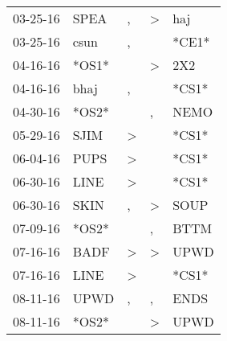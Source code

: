 \begin{supertabular}{p{0.07\textwidth}p{0.06\textwidth}p{0.02\textwidth}p{0.02\textwidth}p{0.06\textwidth}}
          03-25-16\textsuperscript{} &           SPEA\textsuperscript{} &                , &     \textgreater &            haj\textsuperscript{} \\
          03-25-16\textsuperscript{} &           csun\textsuperscript{} &                , &                  &                            *CE1* \\
          04-16-16\textsuperscript{} &                            *OS1* &                  &     \textgreater &            2X2\textsuperscript{} \\
          04-16-16\textsuperscript{} &           bhaj\textsuperscript{} &                , &                  &                            *CS1* \\
          04-30-16\textsuperscript{} &                            *OS2* &                  &                , &           NEMO\textsuperscript{} \\
          05-29-16\textsuperscript{} &           SJIM\textsuperscript{} &     \textgreater &                  &                            *CS1* \\
          06-04-16\textsuperscript{} &           PUPS\textsuperscript{} &     \textgreater &                  &                            *CS1* \\
          06-30-16\textsuperscript{} &           LINE\textsuperscript{} &     \textgreater &                  &                            *CS1* \\
          06-30-16\textsuperscript{} &           SKIN\textsuperscript{} &                , &     \textgreater &           SOUP\textsuperscript{} \\
          07-09-16\textsuperscript{} &                            *OS2* &                  &                , &           BTTM\textsuperscript{} \\
          07-16-16\textsuperscript{} &           BADF\textsuperscript{} &     \textgreater &     \textgreater &           UPWD\textsuperscript{} \\
          07-16-16\textsuperscript{} &           LINE\textsuperscript{} &     \textgreater &                  &                            *CS1* \\
          08-11-16\textsuperscript{} &           UPWD\textsuperscript{} &                , &                , &           ENDS\textsuperscript{} \\
          08-11-16\textsuperscript{} &                            *OS2* &                  &     \textgreater &           UPWD\textsuperscript{} \\

\end{supertabular}
